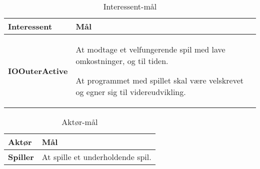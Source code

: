\documentclass[class=article, crop=false]{standalone}
\makeatletter
\let\savespace\@minipagetrue
\makeatother
\begin{document}
    \begin{table}[H]
        \caption{Interessent-mål\cite{del3}}\label{tab:interessent}
        \begin{tabularx}{\textwidth}{lX}

            \rowcolor[gray]{.8}
            \textbf{Interessent}& \textbf{Mål}   \\ \hline
            \textbf{IOOuterActive}       &


            \savespace \begin{compactitem}
                           \item At modtage et velfungerende spil med lave omkostninger, og til tiden.
                           \item At programmet med spillet skal være velskrevet og egner sig til videreudvikling.
            \end{compactitem}

            \\ \hline


        \end{tabularx}


    \end{table}

    \begin{table}[H]
        \caption{Aktør-mål\cite{del3}}\label{tab:aktoer}
        \begin{tabularx}{\textwidth}{lX}

            \rowcolor[gray]{.8}
            \textbf{Aktør}& \textbf{Mål}   \\ \hline
            \textbf{Spiller}      & At spille et underholdende spil.\\ \hline


        \end{tabularx}


    \end{table}
\end{document}
